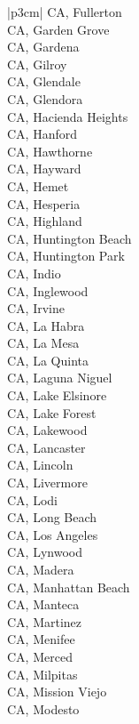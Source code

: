 \begin{customLongTable}{ |p{3cm}| }
CA, Fullerton \\ \hline
CA, Garden Grove \\ \hline
CA, Gardena \\ \hline
CA, Gilroy \\ \hline
CA, Glendale \\ \hline
CA, Glendora \\ \hline
CA, Hacienda Heights \\ \hline
CA, Hanford \\ \hline
CA, Hawthorne \\ \hline
CA, Hayward \\ \hline
CA, Hemet \\ \hline
CA, Hesperia \\ \hline
CA, Highland \\ \hline
CA, Huntington Beach \\ \hline
CA, Huntington Park \\ \hline
CA, Indio \\ \hline
CA, Inglewood \\ \hline
CA, Irvine \\ \hline
CA, La Habra \\ \hline
CA, La Mesa \\ \hline
CA, La Quinta \\ \hline
CA, Laguna Niguel \\ \hline
CA, Lake Elsinore \\ \hline
CA, Lake Forest \\ \hline
CA, Lakewood \\ \hline
CA, Lancaster \\ \hline
CA, Lincoln \\ \hline
CA, Livermore \\ \hline
CA, Lodi \\ \hline
CA, Long Beach \\ \hline
CA, Los Angeles \\ \hline
CA, Lynwood \\ \hline
CA, Madera \\ \hline
CA, Manhattan Beach \\ \hline
CA, Manteca \\ \hline
CA, Martinez \\ \hline
CA, Menifee \\ \hline
CA, Merced \\ \hline
CA, Milpitas \\ \hline
CA, Mission Viejo \\ \hline
CA, Modesto \\ \hline

\end{customLongTable}

